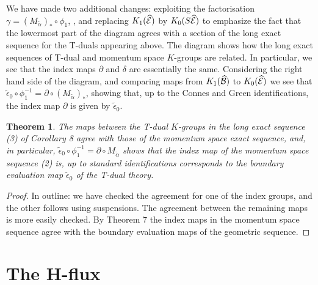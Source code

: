 \documentclass[11pt]{article}
\newcommand{\cb}{{\cal B}}
\newcommand{\ce}{{\cal E}}
\newcommand{\wt}[1]{\widetilde{#1}}
\newcommand{\wh}[1]{\widehat{#1}}
\newcommand\rmap[1]{\stackrel{#1}\longrightarrow}
\newcommand\lmap[1]{\stackrel{#1}\longleftarrow}
\newcommand\lumap[1]{\vcenter{\llap{\scriptsize$#1$}}\uparrow}
\newcommand\rdmap[1]{\downarrow\vcenter{\rlap{\scriptsize$#1$}}}
\newtheorem{theorem}{Theorem}
\begin{document}
\bigskip
We have made two additional changes: exploiting the factorisation $\gamma = (M_{\wt{\alpha}})_*\circ\phi_1$,  \cite[App. A]{HMT17}, and  replacing $K_1(\wh{\ce})$ by $K_0(S\wh{\ce})$ to emphasize the fact that the lowermost part of the diagram agrees with a section of the long exact sequence for the T-duals appearing above.
The diagram shows how the long exact sequences of T-dual and momentum space $K$-groups are related.
In particular, we see that the index maps $\partial$ and $\delta$ are essentially the same. Considering the right hand side of the diagram, and comparing maps from $K_1(\wh{\cb})$ to $K_0(\wh{\ce})$ we see that $\wt{\epsilon}_0\circ\phi_1^{-1} = \partial\circ (M_{\wt{\alpha}})_*$, showing that, up to the Connes and Green identifications, the index map $\partial$ is given by $\wt{\epsilon}_0$.

\begin{theorem}
The maps between the T-dual $K$-groups in the long exact sequence (3) of  Corollary 8 
agree with those of the momentum space exact sequence, and, in particular, $\wt{\epsilon}_0\circ\phi_1^{-1} = \partial\circ M_{\wt{\alpha}}$ shows that the index map of the momentum space sequence (2) is, up to standard identifications corresponds to the boundary evaluation map $\wt{\epsilon}_0$ of the T-dual theory.
\end{theorem}

\begin{proof}
In outline: we have checked the agreement for one of the index groups, and the other follows using suspensions. The agreement between the remaining maps is more easily checked. By Theorem 7 the index maps in the momentum space sequence  agree with the boundary evaluation maps of the geometric sequence.
\end{proof}

%
%

\section{The H-flux}
\end{document}
